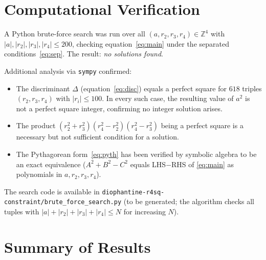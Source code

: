\documentclass[12pt, a4paper]{article}
\theoremstyle{definition}
\newcommand{\Z}{\mathbb{Z}}
\begin{document}
\section{Computational Verification}\label{sec:comp}

A Python brute-force search was run over all $(a, r_2, r_3, r_4) \in \Z^4$
with $|a|, |r_2|, |r_3|, |r_4| \leq 200$, checking equation~\eqref{eq:main}
under the separated conditions~\eqref{eq:sep}.  The result:
\emph{no solutions found}.

Additional analysis via \texttt{sympy} confirmed:
\begin{itemize}[leftmargin=1.5em]
  \item The discriminant $\Delta$ (equation~\eqref{eq:disc}) equals a perfect
    square for $618$ triples $(r_2, r_3, r_4)$ with $|r_i| \leq 100$.  In
    every such case, the resulting value of $a^2$ is not a perfect square
    integer, confirming no integer solution arises.
  \item The product $(r_2^2+r_3^2)(r_4^2-r_2^2)(r_4^2-r_3^2)$ being a perfect
    square is a necessary but not sufficient condition for a solution.
  \item The Pythagorean form~\eqref{eq:pyth} has been verified by symbolic
    algebra to be an exact equivalence ($A^2+B^2-C^2$ equals LHS$-$RHS of
    \eqref{eq:main} as polynomials in $a,r_2,r_3,r_4$).
\end{itemize}

The search code is available in
\texttt{diophantine-r4sq-constraint/brute\_force\_search.py}
(to be generated; the algorithm checks all tuples with
$|a|+|r_2|+|r_3|+|r_4|\leq N$ for increasing $N$).

\section{Summary of Results}
\end{document}
